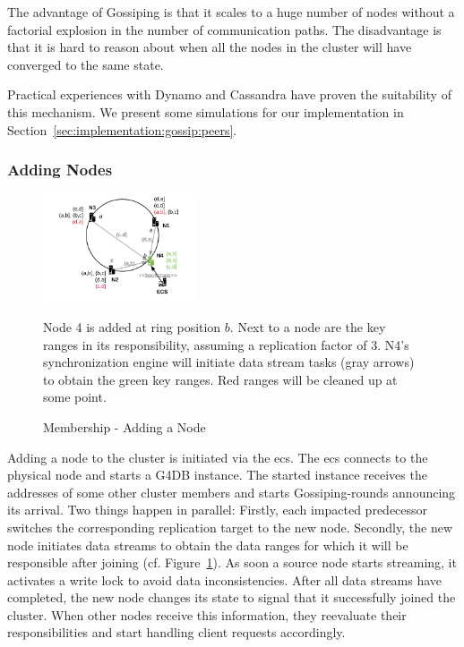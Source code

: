 The advantage of Gossiping is that it scales to a huge number of nodes without
a factorial explosion in the number of communication paths.
The disadvantage is that it is hard to reason about when all the nodes in the cluster
will have converged to the same state.

Practical experiences with Dynamo and Cassandra have proven the suitability of this mechanism.
We present some simulations for our implementation in Section~\ref{sec:implementation:gossip:peers}.

\subsubsection{Adding Nodes}

\begin{figure}[]
	\centering
	\includegraphics[width=0.4\textwidth]{resources/add-node}
	\caption{Membership - Adding a Node}
	\label{fig:add-node}
	{
	Node 4 is added at ring position $b$.
	Next to a node are the key ranges in its responsibility, assuming a replication factor of 3.
	N4's synchronization engine will initiate data stream tasks (gray arrows) to obtain the green key ranges.
	Red ranges will be cleaned up at some point.
	}
\end{figure}

Adding a node to the cluster is initiated via the \ac{ecs}. The \ac{ecs} connects
to the physical node and starts a G4DB instance.
The started instance receives the addresses of some other cluster members and starts
Gossiping-rounds announcing its arrival.
Two things happen in parallel:
Firstly, each impacted predecessor switches the corresponding replication target to the new node.
Secondly, the new node initiates data streams to obtain the data ranges for which it will be
responsible after joining (cf. Figure~\ref{fig:add-node}).
As soon a source node starts streaming, it activates a write lock to avoid data inconsistencies.
After all data streams have completed, the new node changes its state to signal that it
successfully joined the cluster.
When other nodes receive this information, they reevaluate their responsibilities and start
handling client requests accordingly.

